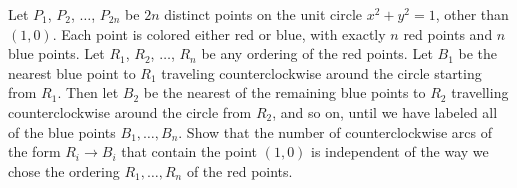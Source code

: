 Let $P_1$,  $P_2$,  $\dots$,  $P_{2n}$ be $2n$ distinct points on the unit circle $x^2+y^2=1$,  other than $(1,0)$. Each point is colored either red or blue, with exactly $n$ red points and $n$ blue points. Let $R_1$,  $R_2$,  $\dots$,  $R_n$ be any ordering of the red points. Let $B_1$ be the nearest blue point to $R_1$ traveling counterclockwise around the circle starting from $R_1$. Then let $B_2$ be the nearest of the remaining blue points to $R_2$ travelling counterclockwise around the circle from $R_2$,  and so on, until we have labeled all of the blue points $B_1, \dots, B_n$. Show that the number of counterclockwise arcs of the form $R_i \to B_i$ that contain the point $(1,0)$ is independent of the way we chose the ordering $R_1, \dots, R_n$ of the red points.